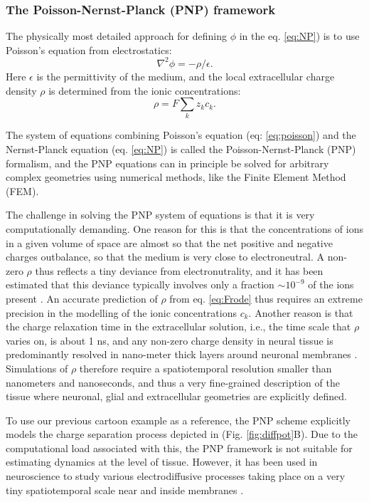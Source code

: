 \subsubsection{The Poisson-Nernst-Planck (PNP) framework}
The physically most detailed approach for defining $\phi$ in the eq. \ref{eq:NP}) is to use Poisson's equation from electrostatics:
\begin{equation}
\nabla^2 \phi = -\rho/\epsilon.
\label{eq:poisson}
\end{equation}
Here $\epsilon$ is the permittivity of the medium, and the local extracellular charge density $\rho$ is determined from the ionic concentrations: 
\begin{equation}
\rho = F \sum_k z_k c_k.
\label{eq:Frode}
\end{equation}

The system of equations combining Poisson's equation (eq: \ref{eq:poisson}) and the Nernst-Planck equation (eq. \ref{eq:NP})
is called the Poisson-Nernst-Planck (PNP) formalism, and the PNP equations can in principle be solved for arbitrary complex geometries using numerical methods, like the Finite Element Method (FEM). 

The challenge in solving the PNP system of equations is that it is very computationally demanding. One reason for this is that the concentrations of ions in a given volume of space are almost so that the net positive and negative charges outbalance, so that the medium is very close to electroneutral. A non-zero $\rho$ thus reflects a tiny deviance from electronutrality, and it has been estimated that this deviance typically involves only a fraction $\sim 10^{-9}$ of the ions present \cite{Aguilella1986}. An accurate prediction of $\rho$ from eq. \ref{eq:Frode} thus requires an extreme precision in the modelling of the ionic concentrations $c_k$. Another reason is that the charge relaxation time in the extracellular solution, i.e., the time scale that $\rho$ varies on, is about 1 ns, and any non-zero charge density in neural tissue is predominantly resolved in nano-meter thick layers around neuronal membranes \cite{Grodzinsky2011, Gratiy2017}. Simulations of $\rho$ therefore require a spatiotemporal resolution smaller than nanometers and nanoseconds, and thus a very fine-grained description of the tissue where neuronal, glial and extracellular geometries are explicitly defined.

To use our previous cartoon example as a reference, the PNP scheme explicitly models the charge separation process depicted in (Fig. \ref{fig:diffpot}B). Due to the computational load associated with this, the PNP framework is not suitable for estimating dynamics at the level of tissue. However, it has been used in neuroscience to study various electrodiffusive processes taking place on a very tiny spatiotemporal scale near and inside membranes \cite{Leonetti1998, Leonetti2004, Lu2007, Lopreore2008, Nanninga2008, Pods2013, Gardner2015}. 


